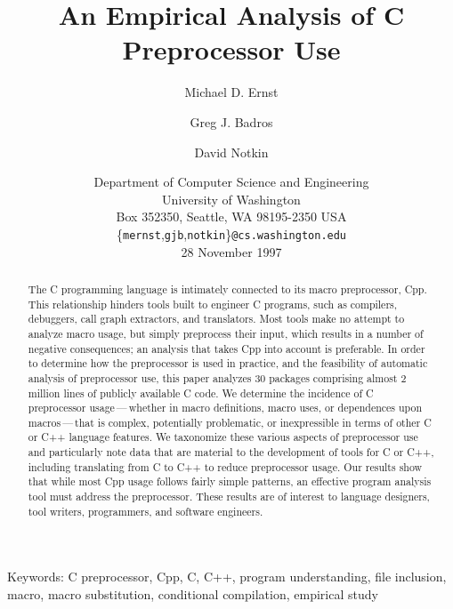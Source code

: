 \documentclass[10pt]{article}
\def\numpackages{30}
\def\numlinesalmost{almost 2 million}
\begin{document}
% 


\title{An Empirical Analysis of C Preprocessor Use}

\author{Michael D. Ernst \and Greg J. Badros \and David Notkin}

\date{%
Department of Computer Science and Engineering \\
University of Washington \\
Box 352350, Seattle, WA  98195-2350  USA \\
{\small \{{\tt mernst},{\tt gjb},{\tt notkin}\}{\tt @cs.washington.edu}} \\
28 November 1997}  

\maketitle

\begin{abstract}
  The C programming language is intimately connected to its macro
  preprocessor, Cpp.  This relationship hinders tools built to engineer C
  programs, such as compilers, debuggers, call graph extractors, and
  translators.  Most tools make no attempt to analyze macro usage, but
  simply preprocess their input, which results in a number of negative
  consequences; an analysis that takes Cpp into account is preferable.  In
  order to determine how the preprocessor is used in practice, and the
  feasibility of automatic analysis of preprocessor use, this paper
  analyzes {\numpackages} packages comprising {\numlinesalmost} lines of publicly
  available C code.  We determine the incidence of C preprocessor
  usage\,---\,whether in macro definitions, macro uses, or dependences upon
  macros\,---\,that is complex, potentially problematic, or inexpressible
  in terms of other C or C++ language features.  We taxonomize these
  various aspects of preprocessor use and particularly note data that are
  material to the development of tools for C or C++, including translating
  from C to C++ to reduce preprocessor usage.  Our results show that while
  most Cpp usage follows fairly simple patterns, an effective program
  analysis tool must address the preprocessor.
  These results are of interest to language designers, tool writers,
  programmers, and software engineers.
\end{abstract}

\noindent
Keywords: C preprocessor, Cpp, C, C++, program understanding, file
inclusion, macro, macro substitution, conditional compilation, empirical study
\end{document}
